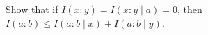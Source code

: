 Show that if $I(x : y) = I(x : y \mid a) = 0$, then $I(a : b) \le I(a : b \mid x) + I(a : b \mid y)$.
